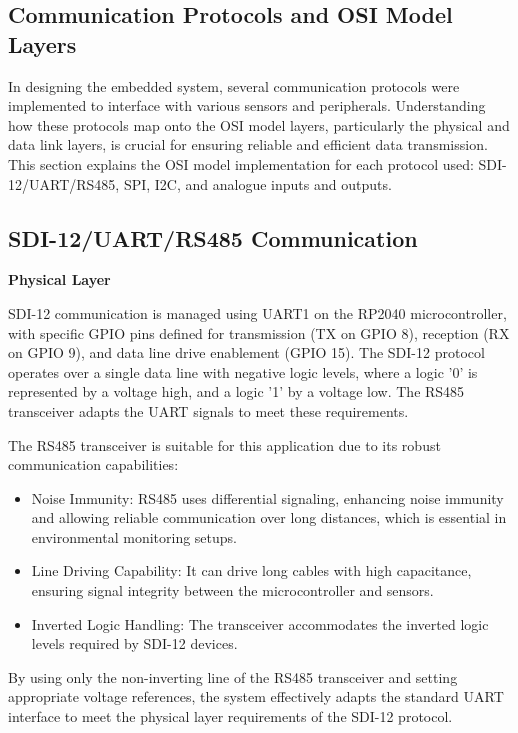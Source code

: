 \subsection{Communication Protocols and OSI Model Layers}

In designing the embedded system, several communication protocols were implemented to interface with various sensors and peripherals. Understanding how these protocols map onto the OSI model layers, particularly the physical and data link layers, is crucial for ensuring reliable and efficient data transmission. This section explains the OSI model implementation for each protocol used: SDI-12/UART/RS485, SPI, I2C, and analogue inputs and outputs.

\subsection{SDI-12/UART/RS485 Communication}
\textbf{Physical Layer}

SDI-12 communication is managed using UART1 on the RP2040 microcontroller, with specific GPIO pins defined for transmission (TX on GPIO 8), reception (RX on GPIO 9), and data line drive enablement (GPIO 15). The SDI-12 protocol operates over a single data line with negative logic levels, where a logic '0' is represented by a voltage high, and a logic '1' by a voltage low. The RS485 transceiver adapts the UART signals to meet these requirements.

The RS485 transceiver is suitable for this application due to its robust communication capabilities:

\begin{itemize}
    \item Noise Immunity: RS485 uses differential signaling, enhancing noise immunity and allowing reliable communication over long distances, which is essential in environmental monitoring setups.
    \item Line Driving Capability: It can drive long cables with high capacitance, ensuring signal integrity between the microcontroller and sensors.
    \item Inverted Logic Handling: The transceiver accommodates the inverted logic levels required by SDI-12 devices.
\end{itemize}

By using only the non-inverting line of the RS485 transceiver and setting appropriate voltage references, the system effectively adapts the standard UART interface to meet the physical layer requirements of the SDI-12 protocol.

